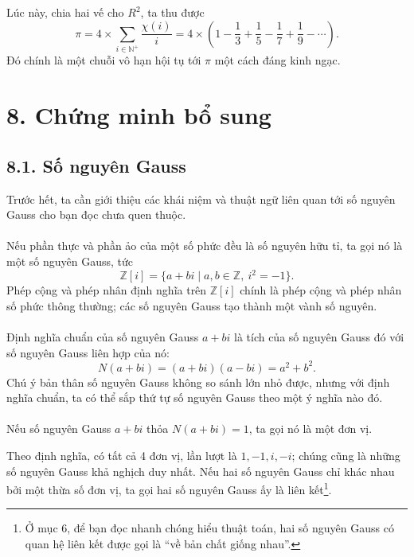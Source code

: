 \documentclass[11pt]{article}
\begin{document}
Lúc này, chia hai vế cho \(R^2\), ta thu được
\[
  \pi=4\times\sum_{i\in\mathbb N^+}\frac{\chi(i)}{i}
  =4\times\left(1-\frac13+\frac15-\frac17+\frac19-\cdots\right).
\]
Đó chính là một chuỗi vô hạn hội tụ tới \(\pi\) một cách đáng kinh ngạc.

\section*{8. Chứng minh bổ sung}

\subsection*{8.1. Số nguyên Gauss}

Trước hết, ta cần giới thiệu các khái niệm và thuật ngữ liên quan tới số
nguyên Gauss cho bạn đọc chưa quen thuộc.

\paragraph{}
Nếu phần thực và phần ảo của một số phức đều là số nguyên hữu tỉ, ta gọi nó là
một số nguyên Gauss, tức
\[
  \mathbb Z[i]=\{a+bi\mid a,b\in\mathbb Z,\ i^2=-1\}.
\]
Phép cộng và phép nhân định nghĩa trên \(\mathbb Z[i]\) chính là phép cộng và
phép nhân số phức thông thường; các số nguyên Gauss tạo thành một vành số
nguyên.

\paragraph{}
Định nghĩa chuẩn của số nguyên Gauss \(a+bi\) là tích của số nguyên Gauss đó
với số nguyên Gauss liên hợp của nó:
\[
  N(a+bi)=(a+bi)(a-bi)=a^2+b^2.
\]
Chú ý bản thân số nguyên Gauss không so sánh lớn nhỏ được, nhưng với định nghĩa
chuẩn, ta có thể sắp thứ tự số nguyên Gauss theo một ý nghĩa nào đó.

\paragraph{}
Nếu số nguyên Gauss \(a+bi\) thỏa \(N(a+bi)=1\), ta gọi nó là một đơn vị.

Theo định nghĩa, có tất cả 4 đơn vị, lần lượt là \(1,-1,i,-i\); chúng cũng là
những số nguyên Gauss khả nghịch duy nhất. Nếu hai số nguyên Gauss chỉ khác
nhau bởi một thừa số đơn vị, ta gọi hai số nguyên Gauss ấy là liên kết\footnote{Ở
mục 6, để bạn đọc nhanh chóng hiểu thuật toán, hai số nguyên Gauss có quan hệ
liên kết được gọi là ``về bản chất giống nhau''.}.
\end{document}
